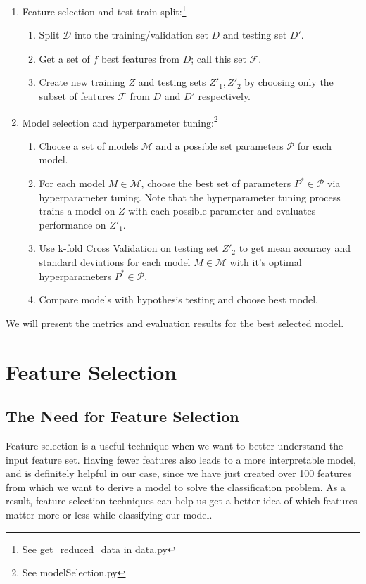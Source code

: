 \documentclass[fleqn]{article}
\begin{document}
    \begin{enumerate}
        \item Feature selection and test-train split:\footnote{See get\_reduced\_data in data.py}
        \begin{enumerate}[label=\roman*.]
            \item Split $ \mathcal{D} $ into the training/validation set $ D $ and testing
            set $ D' $.
            \item Get a set of $ f $ best features from $ D $; call this set $ \mathcal{F} $.
            \item Create new training $ Z $ and testing sets $ Z'_1, Z'_2 $ by
            choosing only the subset of features $ \mathcal{F} $ from $ D $ and $D'$ respectively.
        \end{enumerate}
        \item Model selection and hyperparameter tuning:\footnote{See modelSelection.py}
        \begin{enumerate}[label=\roman*.]
            \item Choose a set of models $ \mathcal{M} $ and a possible set parameters
            $ \mathcal{P} $ for each model.
            \item For each model $ M \in \mathcal{M} $, choose the best set of parameters
            $ P^* \in\mathcal{P} $ via hyperparameter tuning. Note that the hyperparameter
            tuning process trains a model on $ Z $ with each possible parameter and evaluates
            performance on $ Z'_1 $.
            \item Use k-fold Cross Validation on testing set $ Z'_2 $ to get mean accuracy
            and standard deviations for each model $ M \in \mathcal{M} $ with it's
            optimal hyperparameters $ P^* \in\mathcal{P} $.
            \item Compare models with hypothesis testing and choose best model.
        \end{enumerate}
    \end{enumerate}

    We will present the metrics and evaluation results for the best selected model.

    \section{Feature Selection}

    \subsection{The Need for Feature Selection}
    Feature selection is a useful technique when we want to better understand the input
    feature set. Having fewer features also leads to a more interpretable model, and is
    definitely helpful in our case, since we have just created over 100 features from
    which we want to derive a model to solve the classification problem. As a result,
    feature selection techniques can help us get a better idea of which features matter
    more or less while classifying our model.\\
\end{document}

